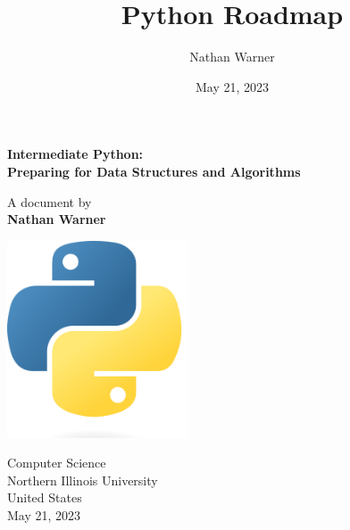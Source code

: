 \documentclass{report}
\title{\Huge{Python Roadmap}}
\author{\huge{Nathan Warner}}
\date{\huge{May 21, 2023}}
\begin{document}
\begin{titlepage}
   \begin{center}
       \vspace*{1cm}

       \textbf{Intermediate Python: \\ Preparing for Data Structures and Algorithms}

       \vspace{0.5cm}
            
       \vspace{1.5cm}

       A document by \\
       \textbf{Nathan Warner}

       \vfill
            
            
       \vspace{0.8cm}
     
       \includegraphics[width=0.4\textwidth]{./figures/python.png}
            
       Computer Science\\
       Northern Illinois University\\
       United States\\
       May 21, 2023
            
   \end{center}
\end{titlepage}
    \pagebreak \bigbreak \noindent
\end{document}
